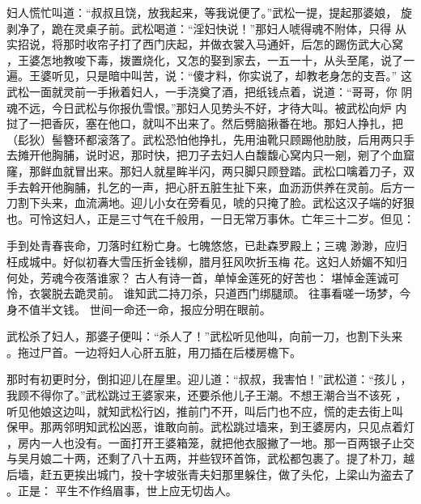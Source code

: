 妇人慌忙叫道：“叔叔且饶，放我起来，等我说便了。”武松一提，提起那婆娘，
旋剥净了，跪在灵桌子前。武松喝道：“淫妇快说！”那妇人唬得魂不附体，只得
从实招说，将那时收帘子打了西门庆起，并做衣裳入马通奸，后怎的踢伤武大心窝
，王婆怎地教唆下毒，拨置烧化，又怎的娶到家去，一五一十，从头至尾，说了一
遍。王婆听见，只是暗中叫苦，说：“傻才料，你实说了，却教老身怎的支吾。”
这武松一面就灵前一手揪着妇人，一手浇奠了酒，把纸钱点着，说道：“哥哥，你
阴魂不远，今日武松与你报仇雪恨。”那妇人见势头不好，才待大叫。被武松向炉
内挝了一把香灰，塞在他口，就叫不出来了。然后劈脑揪番在地。那妇人挣扎，把
（髟狄）髻簪环都滚落了。武松恐怕他挣扎，先用油靴只顾踢他肋肢，后用两只手
去摊开他胸脯，说时迟，那时快，把刀子去妇人白馥馥心窝内只一剜，剜了个血窟
窿，那鲜血就冒出来。那妇人就星眸半闪，两只脚只顾登踏。武松口噙着刀子，双
手去斡开他胸脯，扎乞的一声，把心肝五脏生扯下来，血沥沥供养在灵前。后方一
刀割下头来，血流满地。迎儿小女在旁看见，唬的只掩了脸。武松这汉子端的好狠
也。可怜这妇人，正是三寸气在千般用，一日无常万事休。亡年三十二岁。但见：

手到处青春丧命，刀落时红粉亡身。七魄悠悠，已赴森罗殿上；三魂
渺渺，应归枉成城中。好似初春大雪压折金钱柳，腊月狂风吹折玉梅
花。这妇人娇媚不知归何处，芳魂今夜落谁家？
古人有诗一首，单悼金莲死的好苦也：
堪悼金莲诚可怜，衣裳脱去跪灵前。
谁知武二持刀杀，只道西门绑腿顽。
往事看嗟一场梦，今身不值半文钱。
世间一命还一命，报应分明在眼前。

武松杀了妇人，那婆子便叫：“杀人了！”武松听见他叫，向前一刀，也割下头来
。拖过尸首。一边将妇人心肝五脏，用刀插在后楼房檐下。

那时有初更时分，倒扣迎儿在屋里。迎儿道：“叔叔，我害怕！”武松道：“孩儿
，我顾不得你了。”武松跳过王婆家来，还要杀他儿子王潮。不想王潮合当不该死
，听见他娘这边叫，就知武松行凶，推前门不开，叫后门也不应，慌的走去街上叫
保甲。那两邻明知武松凶恶，谁敢向前。武松跳过墙来，到王婆房内，只见点着灯
，房内一人也没有。一面打开王婆箱笼，就把他衣服撇了一地。那一百两银子止交
与吴月娘二十两，还剩了八十五两，并些钗环首饰，武松都包裹了。提了朴刀，越
后墙，赶五更挨出城门，投十字坡张青夫妇那里躲住，做了头佗，上梁山为盗去了
。正是：
平生不作绉眉事，世上应无切齿人。